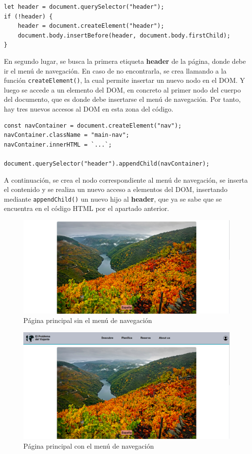 \documentclass[11pt, a4paper]{book}
\begin{document}
    \begin{lstlisting}
let header = document.querySelector("header");
if (!header) {
	header = document.createElement("header");
	document.body.insertBefore(header, document.body.firstChild);
}
	\end{lstlisting}

	En segundo lugar, se busca la primera etiqueta \textbf{header} de la página, donde debe ir el menú de navegación. En caso de no encontrarla, se crea llamando a la función \texttt{createElement()}, la cual permite insertar un nuevo nodo en el DOM. Y luego se accede a un elemento del DOM, en concreto al primer nodo del cuerpo del documento, que es donde debe insertarse el menú de navegación.	Por tanto, hay tres nuevos accesos al DOM en esta zona del código. 
	
	\begin{lstlisting}
const navContainer = document.createElement("nav");
navContainer.className = "main-nav";
navContainer.innerHTML = `...`;

document.querySelector("header").appendChild(navContainer);
	\end{lstlisting}
	
	A continuación, se crea el nodo correspondiente al menú de navegación, se inserta el contenido y se realiza un nuevo acceso a elementos del DOM, insertando mediante \texttt{appendChild()} un nuevo hijo al \textbf{header}, que ya se sabe que se encuentra en el código HTML por el apartado anterior.
	
	\begin{figure} [H]
		\centering
		\includegraphics[width=\textwidth]{CSS/1-1 1920cut.png}
		\caption{Página principal sin el menú de navegación}
	\end{figure}
	\begin{figure} [H]
		\centering
		\includegraphics[width=\textwidth]{CSS/1-1 1920.png}
		\caption{Página principal con el menú de navegación}
	\end{figure}
\end{document}
